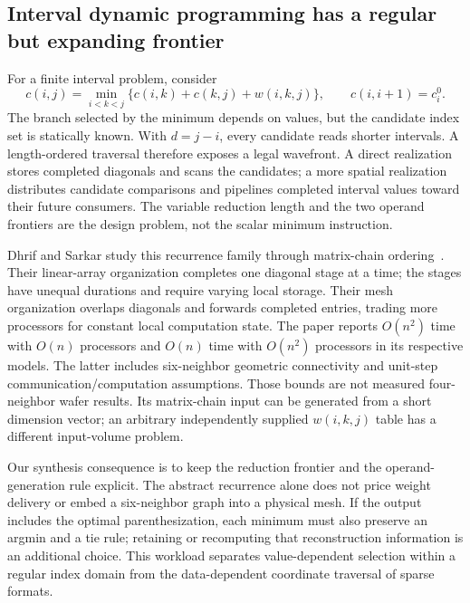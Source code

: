 \documentclass[final,3p,times,authoryear]{elsarticle}
\begin{document}
\subsection{Interval dynamic programming has a regular but expanding frontier}
For a finite interval problem, consider
\begin{equation}\label{eq:interval-dp}
 c(i,j)=\min_{i<k<j}\{c(i,k)+c(k,j)+w(i,k,j)\},
 \qquad c(i,i+1)=c_i^0.
\end{equation}
The branch selected by the minimum depends on values, but the candidate index set is statically known. With $d=j-i$, every candidate reads shorter intervals. A length-ordered traversal therefore exposes a legal wavefront. A direct realization stores completed diagonals and scans the candidates; a more spatial realization distributes candidate comparisons and pipelines completed interval values toward their future consumers. The variable reduction length and the two operand frontiers are the design problem, not the scalar minimum instruction.

Dhrif and Sarkar study this recurrence family through matrix-chain ordering~\citep{dhrif1992}. Their linear-array organization completes one diagonal stage at a time; the stages have unequal durations and require varying local storage. Their mesh organization overlaps diagonals and forwards completed entries, trading more processors for constant local computation state. The paper reports $O(n^2)$ time with $O(n)$ processors and $O(n)$ time with $O(n^2)$ processors in its respective models. The latter includes six-neighbor geometric connectivity and unit-step communication/computation assumptions. Those bounds are not measured four-neighbor wafer results. Its matrix-chain input can be generated from a short dimension vector; an arbitrary independently supplied $w(i,k,j)$ table has a different input-volume problem.

Our synthesis consequence is to keep the reduction frontier and the operand-generation rule explicit. The abstract recurrence alone does not price weight delivery or embed a six-neighbor graph into a physical mesh. If the output includes the optimal parenthesization, each minimum must also preserve an argmin and a tie rule; retaining or recomputing that reconstruction information is an additional choice. This workload separates value-dependent selection within a regular index domain from the data-dependent coordinate traversal of sparse formats.
\end{document}
